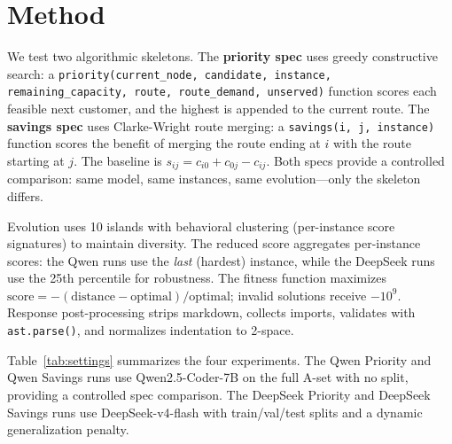 \documentclass{article}
\begin{document}
\vspace{-4pt}
\section{Method}
\vspace{-4pt}

We test two algorithmic skeletons. The \textbf{priority spec} uses greedy constructive search: a \texttt{priority(current\_node, candidate, instance, remaining\_capacity, route, route\_demand, unserved)} function scores each feasible next customer, and the highest is appended to the current route. The \textbf{savings spec} uses Clarke-Wright route merging: a \texttt{savings(i, j, instance)} function scores the benefit of merging the route ending at $i$ with the route starting at $j$. The baseline is $s_{ij} = c_{i0} + c_{0j} - c_{ij}$. Both specs provide a controlled comparison: same model, same instances, same evolution---only the skeleton differs.

Evolution uses 10 islands with behavioral clustering (per-instance score signatures) to maintain diversity. The reduced score aggregates per-instance scores: the Qwen runs use the \emph{last} (hardest) instance, while the DeepSeek runs use the 25th percentile for robustness. The fitness function maximizes $\text{score} = -(\text{distance} - \text{optimal}) / \text{optimal}$; invalid solutions receive $-10^9$. Response post-processing strips markdown, collects imports, validates with \texttt{ast.parse()}, and normalizes indentation to 2-space.

Table~\ref{tab:settings} summarizes the four experiments. The Qwen Priority and Qwen Savings runs use Qwen2.5-Coder-7B on the full A-set with no split, providing a controlled spec comparison. The DeepSeek Priority and DeepSeek Savings runs use DeepSeek-v4-flash with train/val/test splits and a dynamic generalization penalty.
\end{document}
